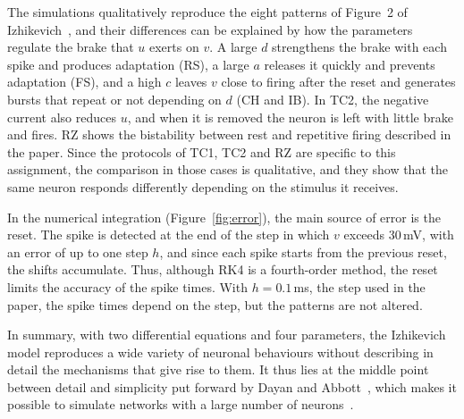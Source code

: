 \documentclass[aps,pre,twocolumn,10pt,nofootinbib,floatfix]{revtex4-2}
\begin{document}
The simulations qualitatively reproduce the eight patterns of Figure~2 of
Izhikevich~\cite{izhikevich2003}, and their differences can be explained by how the parameters
regulate the brake that $u$ exerts on $v$. A large $d$ strengthens the brake with each spike
and produces adaptation (RS), a large $a$ releases it quickly and prevents adaptation (FS),
and a high $c$ leaves $v$ close to firing after the reset and generates bursts that repeat or
not depending on $d$ (CH and IB). In TC2, the negative current also reduces $u$, and when it is
removed the neuron is left with little brake and fires. RZ shows the bistability between rest
and repetitive firing described in the paper. Since the protocols of TC1, TC2 and RZ are
specific to this assignment, the comparison in those cases is qualitative, and they show that
the same neuron responds differently depending on the stimulus it receives.

In the numerical integration (Figure~\ref{fig:error}), the main source of error is the
reset. The spike is detected at the end of the step in which $v$ exceeds 30\,mV, with an error
of up to one step $h$, and since each spike starts from the previous reset, the shifts
accumulate. Thus, although RK4 is a fourth-order method, the reset limits the accuracy of the
spike times. With $h = 0.1$\,ms, the step used in the paper, the spike times depend on the
step, but the patterns are not altered.

In summary, with two differential equations and four parameters, the Izhikevich model
reproduces a wide variety of neuronal behaviours without describing in detail the mechanisms
that give rise to them. It thus lies at the middle point between detail and simplicity put
forward by Dayan and Abbott~\cite{dayan2001}, which makes it possible to simulate networks
with a large number of neurons~\cite{izhikevich2003}.


\end{document}
